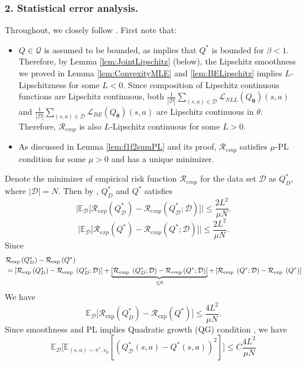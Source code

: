 \subsubsection*{2. Statistical error analysis.}

\noindent 
Throughout, we closely follow \citet{charles2018stability}. First note that:
\begin{itemize}[leftmargin=*]
\item $Q\in\mathcal{Q}$ is assumed to be bounded, as \citep{rust1994structural} implies that $Q^\ast$ is bounded for $\beta<1$. Therefore, by Lemma \ref{lem:JointLipschitz} (below), the Lipschitz smoothness we proved in Lemma \ref{lem:ConvexityMLE} and \ref{lem:BELipschitz} implies $L$-Lipschitzness for some $L<0$. Since composition of Lipschitz continuous functions are Lipschitz continuous, both $\frac{1}{|\mathcal{D}|} \sum_{(s, a) \in \mathcal{D}} \mathcal{L}_{N L L}(Q_{\boldsymbol{\theta}})(s, a)$ and $\frac{1}{|\mathcal{D}|} \sum_{(s, a) \in \mathcal{D}} \mathcal{L}_{B E}(Q_{\boldsymbol{\theta}})(s, a)$ are Lipschitz continuous in $\theta$. Therefore, $\mathcal{R}_{emp}$ is also $L$-Lipschitz continuous for some $L>0$.
\item As discussed in Lemma \ref{lem:f1f2sumPL} and its proof, $\mathcal{R}_{emp}$ satisfies $\mu$-PL condition for some $\mu>0$ and has a unique minimizer. 
\end{itemize}
Denote the minimizer of empirical risk function $\mathcal{R}_{emp}$ for the data set $\mathcal{D}$ as $Q^\ast_{D}$, where $|\mathcal{D}|=N$. Then by \citet{charles2018stability}, $Q^\ast_{D}$ and $Q^\ast$ satisfies
$$
\bigl|\mathbb{E}_{\mathcal{D}}\bigl[\mathcal{R}_{exp}(Q^\ast_{\mathcal{D}})-\mathcal{R}_{emp}(Q^\ast_{\mathcal{D}};\mathcal{D})\bigr]\bigr| \le \frac{2L^2}{\mu N}.
$$
$$
\bigl|\mathbb{E}_{\mathcal{D}}\bigl[\mathcal{R}_{exp}(Q^\ast)-\mathcal{R}_{emp}(Q^\ast;\mathcal{D})\bigr]\bigr| \le \frac{2L^2}{\mu N}.
$$
Since
\begin{align}
    &\mathcal{R}_{\exp }\left(Q_D^*\right)-\mathcal{R}_{\exp }\left(Q^*\right) \notag
    \\
    &=\left[\mathcal{R}_{\exp }\left(Q_D^*\right)-\mathcal{R}_{\text {emp }}\left(Q_D^* ; \mathcal{D}\right)\right]+\underbrace{\left[\mathcal{R}_{\text {emp }}\left(Q_D^* ; \mathcal{D}\right)-\mathcal{R}_{e m p}\left(Q^* ; \mathcal{D}\right)\right]}_{\leq 0}+\left[\mathcal{R}_{\text {emp }}\left(Q^* ; \mathcal{D}\right)-\mathcal{R}_{\text {exp }}\left(Q^*\right)\right] \notag
\end{align}
We have 
$$
\mathbb{E}_{\mathcal{D}}\bigl[\mathcal{R}_{\exp }\left(Q_D^*\right)-\mathcal{R}_{\exp }\left(Q^*\right)\bigr] \le \frac{4L^2}{\mu N}.
$$
Since smoothness and PL implies Quadratic growth (QG) condition \citep{liao2024error}, we have 
$$
\mathbb{E}_{\mathcal{D}}\bigl[\mathbb{E}_{(s, a) \sim \pi^*, v_0}\left[\left(Q^\ast_\mathcal{D}(s, a)-Q^\ast(s, a)\right)^2\right]\bigr] \le  C\frac{4 L^2}{\mu N}
$$

